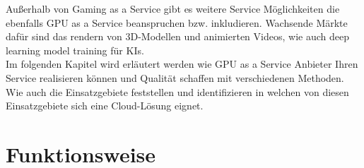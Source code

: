 \documentclass[12pt,toc=bib,toc=listof]{scrreprt}
\begin{document}
Außerhalb von Gaming as a Service gibt es weitere Service 
Möglichkeiten die ebenfalls GPU as a Service beanspruchen bzw. inkludieren. Wachsende Märkte dafür sind
das rendern von 3D-Modellen und animierten Videos, 
wie auch deep learning model training für KIs. 
\\Im folgenden Kapitel wird erläutert werden wie GPU as a Service Anbieter Ihren Service 
realisieren können und Qualität schaffen mit verschiedenen Methoden. 
Wie auch die Einsatzgebiete feststellen und identifizieren in 
welchen von diesen Einsatzgebiete sich eine Cloud-Lösung eignet.

\section{Funktionsweise}
\label{sec: Funktionsweise}
\end{document}
